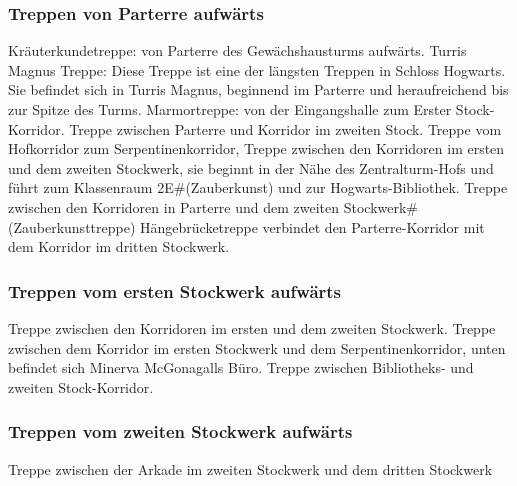 \documentclass[a4paper, 10pt]{article}
\begin{document}
\subsubsection*{\large Treppen von Parterre aufwärts}
Kräuterkundetreppe: von Parterre des Gewächshausturms aufwärts.
\vspace{10pt}
\newline
Turris Magnus Treppe: Diese Treppe ist eine der längsten Treppen in Schloss Hogwarts. Sie befindet sich in Turris Magnus, beginnend im Parterre und heraufreichend bis zur Spitze des Turms.
\vspace{10pt}
\newline
Marmortreppe: von der Eingangshalle zum Erster Stock-Korridor.
\vspace{10pt}
\newline
Treppe zwischen Parterre und Korridor im zweiten Stock.
\vspace{10pt}
\newline
Treppe vom Hofkorridor zum Serpentinenkorridor,
\vspace{10pt}
\newline
Treppe zwischen den Korridoren im ersten und dem zweiten Stockwerk, sie beginnt in der Nähe des Zentralturm-Hofs und führt zum Klassenraum 2E#(Zauberkunst) und zur Hogwarts-Bibliothek.
\vspace{10pt}
\newline
Treppe zwischen den Korridoren in Parterre und dem zweiten Stockwerk#(Zauberkunsttreppe)
Hängebrücketreppe verbindet den Parterre-Korridor mit dem Korridor im dritten Stockwerk.
\subsubsection*{\large Treppen vom ersten Stockwerk aufwärts}
Treppe zwischen den Korridoren im ersten und dem zweiten Stockwerk.
\vspace{10pt}
\newline
Treppe zwischen dem Korridor im ersten Stockwerk und dem Serpentinenkorridor, unten befindet sich Minerva McGonagalls Büro.
\vspace{10pt}
\newline
Treppe zwischen Bibliotheks- und zweiten Stock-Korridor.
\subsubsection*{\large Treppen vom zweiten Stockwerk aufwärts}
Treppe zwischen der Arkade im zweiten Stockwerk und dem dritten Stockwerk
\end{document}
